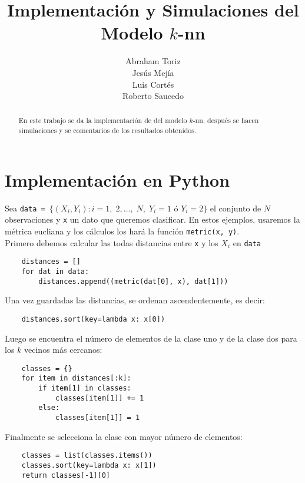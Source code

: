 \documentclass[11pt,letterpaper,reqno]{article}
\title{Implementación y Simulaciones del Modelo $k$-nn}
\author{Abraham Toriz\\ Jesús Mejía\\ Luis Cortés\\ Roberto Saucedo}
\begin{document}
\maketitle
\begin{abstract}
En este trabajo se da la implementación  de del modelo $k$-nn, después se hacen simulaciones y se comentarios de los resultados obtenidos.
\end{abstract}

\section{Implementación en Python}
Sea \verb|data = |$\{(X_i, Y_i): i=1,\;2,\ldots,\;N,\; Y_i=1 \text{ ó } Y_i=2\}$ el conjunto de $N$ observaciones y \verb|x| un dato que queremos clasificar. En estos ejemplos, usaremos la métrica eucliana y los cálculos los hará la función \verb|metric(x, y)|.\\

Primero debemos calcular las todas distancias entre \verb|x| y los $X_i$ en \verb|data|
\begin{verbatim}
    distances = []
    for dat in data:
        distances.append((metric(dat[0], x), dat[1]))
\end{verbatim}

Una vez guardadas las distancias, se ordenan ascendentemente, es decir:
\begin{verbatim}
    distances.sort(key=lambda x: x[0])
\end{verbatim}
Luego se encuentra el número de elementos de la clase uno y de la clase dos para los $k$ vecinos más cercanos:
\begin{verbatim}
    classes = {}
    for item in distances[:k]:
        if item[1] in classes:
            classes[item[1]] += 1
        else:
            classes[item[1]] = 1
\end{verbatim}
Finalmente se selecciona la clase con mayor número de elementos:
\begin{verbatim}
    classes = list(classes.items())
    classes.sort(key=lambda x: x[1])
    return classes[-1][0]
\end{verbatim}
\end{document}
